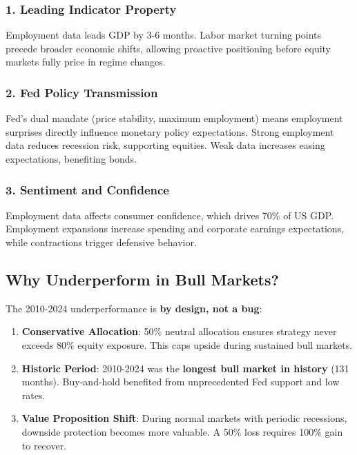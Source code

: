 \documentclass[12pt,a4paper]{article}
\begin{document}
\subsubsection{1. Leading Indicator Property}

Employment data leads GDP by 3-6 months. Labor market turning points precede broader economic shifts, allowing proactive positioning before equity markets fully price in regime changes.

\subsubsection{2. Fed Policy Transmission}

Fed's dual mandate (price stability, maximum employment) means employment surprises directly influence monetary policy expectations. Strong employment data reduces recession risk, supporting equities. Weak data increases easing expectations, benefiting bonds.

\subsubsection{3. Sentiment and Confidence}

Employment data affects consumer confidence, which drives 70\% of US GDP. Employment expansions increase spending and corporate earnings expectations, while contractions trigger defensive behavior.

\subsection{Why Underperform in Bull Markets?}

The 2010-2024 underperformance is \textbf{by design, not a bug}:

\begin{enumerate}
    \item \textbf{Conservative Allocation}: 50\% neutral allocation ensures strategy never exceeds 80\% equity exposure. This caps upside during sustained bull markets.

    \item \textbf{Historic Period}: 2010-2024 was the \textbf{longest bull market in history} (131 months). Buy-and-hold benefited from unprecedented Fed support and low rates.

    \item \textbf{Value Proposition Shift}: During normal markets with periodic recessions, downside protection becomes more valuable. A 50\% loss requires 100\% gain to recover.
\end{enumerate}
\end{document}
